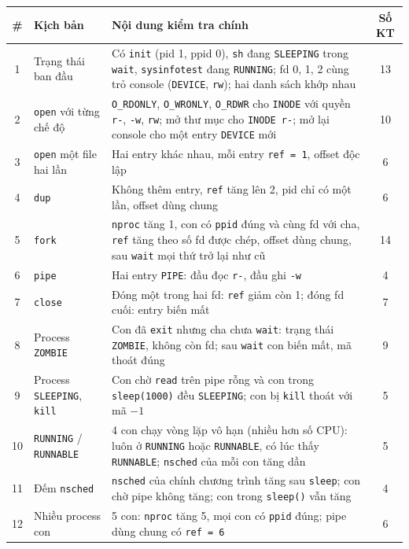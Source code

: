\begin{longtable}{|c|p{4.2cm}|p{8.6cm}|c|}
\hline
\textbf{\#} & \textbf{Kịch bản} & \textbf{Nội dung kiểm tra chính} & \textbf{Số KT} \\ \hline
\endhead
1 & Trạng thái ban đầu & Có \texttt{init} (pid 1, ppid 0), \texttt{sh} đang \texttt{SLEEPING} trong \texttt{wait}, \texttt{sysinfotest} đang \texttt{RUNNING}; fd 0, 1, 2 cùng trỏ console (\texttt{DEVICE}, \texttt{rw}); hai danh sách khớp nhau & 13 \\ \hline
2 & \texttt{open} với từng chế độ & \texttt{O\_RDONLY}, \texttt{O\_WRONLY}, \texttt{O\_RDWR} cho \texttt{INODE} với quyền \texttt{r-}, \texttt{-w}, \texttt{rw}; mở thư mục cho \texttt{INODE r-}; mở lại console cho một entry \texttt{DEVICE} mới & 10 \\ \hline
3 & \texttt{open} một file hai lần & Hai entry khác nhau, mỗi entry \texttt{ref = 1}, offset độc lập & 6 \\ \hline
4 & \texttt{dup} & Không thêm entry, \texttt{ref} tăng lên 2, pid chỉ có một lần, offset dùng chung & 6 \\ \hline
5 & \texttt{fork} & \texttt{nproc} tăng 1, con có \texttt{ppid} đúng và cùng fd với cha, \texttt{ref} tăng theo số fd được chép, offset dùng chung, sau \texttt{wait} mọi thứ trở lại như cũ & 14 \\ \hline
6 & \texttt{pipe} & Hai entry \texttt{PIPE}: đầu đọc \texttt{r-}, đầu ghi \texttt{-w} & 4 \\ \hline
7 & \texttt{close} & Đóng một trong hai fd: \texttt{ref} giảm còn 1; đóng fd cuối: entry biến mất & 7 \\ \hline
8 & Process \texttt{ZOMBIE} & Con đã \texttt{exit} nhưng cha chưa \texttt{wait}: trạng thái \texttt{ZOMBIE}, không còn fd; sau \texttt{wait} con biến mất, mã thoát đúng & 9 \\ \hline
9 & Process \texttt{SLEEPING}, \texttt{kill} & Con chờ \texttt{read} trên pipe rỗng và con trong \texttt{sleep(1000)} đều \texttt{SLEEPING}; con bị \texttt{kill} thoát với mã $-1$ & 5 \\ \hline
10 & \texttt{RUNNING} / \texttt{RUNNABLE} & 4 con chạy vòng lặp vô hạn (nhiều hơn số CPU): luôn ở \texttt{RUNNING} hoặc \texttt{RUNNABLE}, có lúc thấy \texttt{RUNNABLE}; \texttt{nsched} của mỗi con tăng dần & 5 \\ \hline
11 & Đếm \texttt{nsched} & \texttt{nsched} của chính chương trình tăng sau \texttt{sleep}; con chờ pipe không tăng; con trong \texttt{sleep()} vẫn tăng & 4 \\ \hline
12 & Nhiều process con & 5 con: \texttt{nproc} tăng 5, mọi con có \texttt{ppid} đúng; pipe dùng chung có \texttt{ref = 6} & 6 \\ \hline

\end{longtable}
